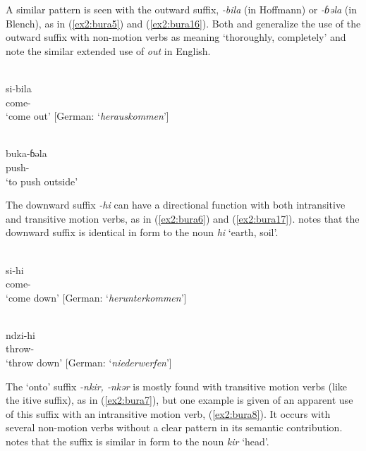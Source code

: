 A similar pattern is seen with the outward suffix, \textit{-bila} (in Hoffmann) or \textit{-ɓəla} (in Blench), as in (\ref{ex2:bura5}) and (\ref{ex2:bura16}). Both \citet[274]{hoffmannUntersuchungenZurStruktur1955} and \citet[3]{blenchBuraVerbalExtensions2010} generalize the use of the outward suffix with non-motion verbs as meaning `thoroughly, completely' and note the similar extended use of \textit{out} in English. 

\ea\label{ex2:bura5}
 \\
\gll  si-bila \\
come- \\
\glt `come out' [German: `\textit{herauskommen}']

\ex\label{ex2:bura16}
 \\
\gll  buka-ɓəla \\
push- \\
\glt `to push outside'
\z

The downward suffix \textit{-hi} can have a directional function with both intransitive and transitive motion verbs, as in (\ref{ex2:bura6}) and (\ref{ex2:bura17}). \citet[282]{hoffmannUntersuchungenZurStruktur1955} notes that the downward suffix is identical in form to the noun \textit{hi} `earth, soil'. 

\ea\label{ex2:bura6}
 \\
\gll si-hi \\
come- \\
\glt `come down' [German: `\textit{herunterkommen}']

\ex\label{ex2:bura17}
 \\
\gll ndzi-hi \\
throw- \\
\glt `throw down' [German: `\textit{niederwerfen}']
\z 

The `onto' suffix \textit{-nkir, -nkər} is mostly found with transitive motion verbs (like the itive suffix), as in (\ref{ex2:bura7}), but one example is given of an apparent use of this suffix with an intransitive motion verb, (\ref{ex2:bura8}). It occurs with several non-motion verbs without a clear pattern in its semantic contribution. \citet[292]{hoffmannUntersuchungenZurStruktur1955} notes that the suffix is similar in form to the noun \textit{kir} `head'. 


